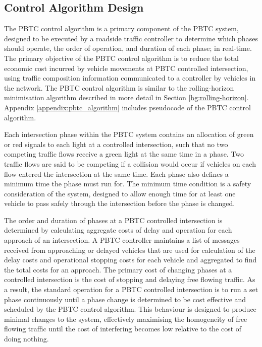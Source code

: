 \subsection {Control Algorithm Design}
\label{sec:PBTCDesign}

The PBTC control algorithm is a primary component of the PBTC system, designed to be executed by a roadside traffic controller to determine which phases should operate, the order of operation, and duration of each phase; in real-time. The primary objective of the PBTC control algorithm is to reduce the total economic cost incurred by vehicle movements  at PBTC controlled intersection, using traffic composition information communicated to a controller by vehicles in the network. The PBTC control algorithm is similar to the rolling-horizon minimisation algorithm described in more detail in Section \ref{bg:rolling-horizon}. Appendix \ref{appendix:pbtc_algorithm} includes pseudocode of the PBTC control algorithm.

Each intersection phase within the PBTC system contains an allocation of green or red signals to each light at a controlled intersection, such that no two competing traffic flows receive a green light at the same time in a phase. Two traffic flows are said to be competing if a collision would occur if vehicles on each flow entered the intersection at the same time. Each phase also defines a minimum time the phase must run for.  The minimum time condition is a safety consideration of the system, designed to allow enough time for at least one vehicle to pass safely through the intersection before the phase is changed. 

The order and duration of phases at a PBTC controlled intersection is determined by calculating aggregate costs of delay and operation for each approach of an intersection. A PBTC controller maintains a list of messages received from approaching or delayed vehicles that are used for calculation of the delay costs and operational stopping costs for each vehicle and aggregated to find the total costs for an approach. The primary cost of changing phases at a controlled intersection is the cost of stopping and delaying free flowing traffic. As a result, the standard operation for a PBTC controlled intersection is to run a set phase continuously until a phase change is determined to be cost effective and scheduled by the PBTC control algorithm. This behaviour is designed to produce minimal changes to the system, effectively maximising the homogeneity of free flowing traffic until the cost of interfering becomes low relative to the cost of doing nothing. 

